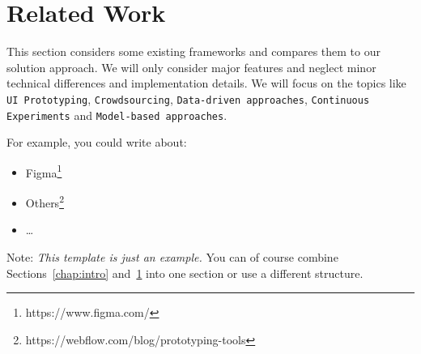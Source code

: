 \chapter{Related Work} \label{chap:csr}

This section considers some existing frameworks and compares them to our solution approach. 
We will only consider major features and neglect minor technical differences and implementation details. 
We will focus on the topics like \texttt{UI Prototyping}, \texttt{Crowdsourcing}, \texttt{Data-driven approaches}, \texttt{Continuous Experiments} and \texttt{Model-based approaches}. 

For example, you could write about: 
\begin{itemize}
	\item Figma\footnote{https://www.figma.com/}
	\item Others\footnote{https://webflow.com/blog/prototyping-tools} 	
	\item \dots
\end{itemize}

Note: \emph{This template is just an example.} You can of course combine Sections~\ref{chap:intro} and~\ref{chap:csr} into one section or use a different structure.